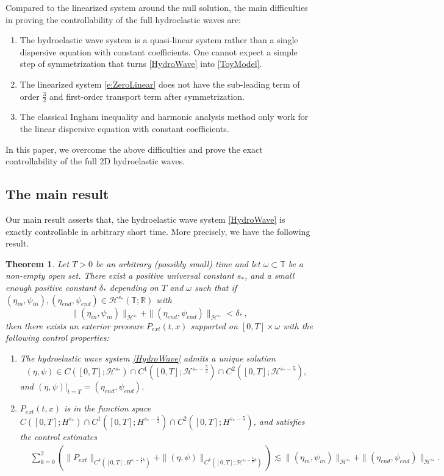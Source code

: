 \documentclass[12pt]{amsart}
\newtheorem{theorem}{Theorem}[section]
\theoremstyle{remark}
\theoremstyle{definition}
\numberwithin{equation}{section}
\newcommand{\R}{\mathbb{R}}
\renewcommand{\H}{{\mathcal H }}
\newcommand{\f}{\frac}
\newcommand{\T}{{\mathbb T}}
\begin{document}
Compared to the linearized system around the null solution, the main difficulties in proving the controllability of the full hydroelastic waves are:
\begin{enumerate}
\item The hydroelastic wave system is a quasi-linear system rather than a single dispersive equation with constant coefficients.
One cannot expect a simple step of symmetrization that turns \eqref{HydroWave} into \eqref{ToyModel}.

\item  The linearized system \eqref{e:ZeroLinear} does not have the sub-leading term of order $\f32$ and first-order transport term after symmetrization.

\item The classical Ingham inequality and harmonic analysis method only work for the linear dispersive equation with constant coefficients.
\end{enumerate}
In this paper, we overcome the above difficulties and prove the exact controllability of the full 2D hydroelastic waves.

\subsection{The main result}
Our main result asserts that, the hydroelastic wave system \eqref{HydroWave} is exactly controllable in arbitrary short time.
More precisely, we have the following result.
\begin{theorem}  \label{t:MainResult}
 Let $T>0$ be an arbitrary (possibly small) time and let $\omega\subset \T $ be a non-empty open set.
 There exist a positive universal constant $s_*$, and a small enough positive constant $\delta_*$ depending on $T$ and $\omega$ such that if $(\eta_{in}, \psi_{in}), (\eta_{end}, \psi_{end}) \in \H^{s_*}(\mathbb{T}; \R)$ with
 \begin{equation*}
     \|(\eta_{in}, \psi_{in})\|_{\H^{s_*}} +  \|(\eta_{end}, \psi_{end})\|_{\H^{s_*}} < \delta_* \,,
 \end{equation*}
 then there exists an exterior pressure $P_{ext}(t, x)$ supported on $[0,T]\times\omega$ with the following control properties:
 \begin{enumerate}  
\item The hydroelastic wave system \eqref{HydroWave} admits a unique solution
$$(\eta, \psi) \in C([0,T]; \H^{s_*})\cap C^1([0,T]; \H^{s_*-\f52})\cap C^2([0,T]; \H^{s_*-5}),$$ and $(\eta, \psi)|_{t=T} = (\eta_{end}, \psi_{end})$.
\item $P_{ext}(t, x)$ is in the function space $C([0,T]; H^{s_*})\cap C^1([0,T]; H^{s_*-\f52})\cap C^2([0,T]; H^{s_*-5})$, and satisfies the control estimates
\begin{align*}
   & \sum_{k=0}^2 \left(\|P_{ext}\|_{C^k([0,T]; H^{s_*-\f52 k})}  + \|(\eta, \psi)\|_{C^k([0,T]; \H^{s_*-\f52 k})}\right)  \lesssim    \|(\eta_{in}, \psi_{in})\|_{\H^{s_*}} +  \|(\eta_{end}, \psi_{end})\|_{\H^{s_*}}.
\end{align*}
 \end{enumerate}
\end{theorem}
\end{document}
